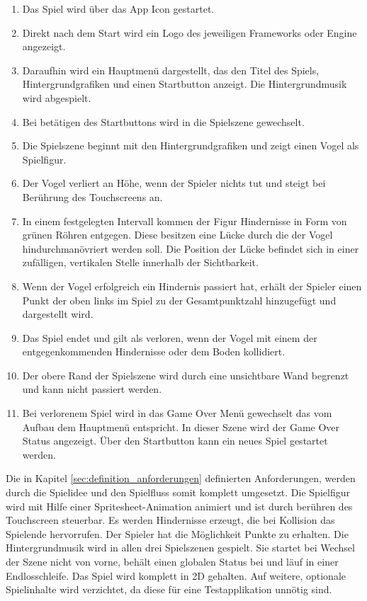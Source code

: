 \begin{enumerate}
	\item Das Spiel wird über das App Icon gestartet.
	\item Direkt nach dem Start wird ein Logo des jeweiligen Frameworks oder Engine angezeigt.
	\item Daraufhin wird ein Hauptmenü dargestellt, das den Titel des Spiels, Hintergrundgrafiken und einen Startbutton anzeigt. Die Hintergrundmusik wird abgespielt.
	\item Bei betätigen des Startbuttons wird in die Spielszene gewechselt.
	\item Die Spielszene beginnt mit den Hintergrundgrafiken und zeigt einen Vogel als Spielfigur.
	\item Der Vogel verliert an Höhe, wenn der Spieler nichts tut und steigt bei Berührung des Touchscreens an.
	\item In einem festgelegten Intervall kommen der Figur Hindernisse in Form von grünen Röhren entgegen. Diese besitzen eine Lücke durch die der Vogel hindurchmanövriert werden soll. Die Position der Lücke befindet sich in einer zufälligen, vertikalen Stelle innerhalb der Sichtbarkeit.
	\item Wenn der Vogel erfolgreich ein Hindernis passiert hat, erhält der Spieler einen Punkt der oben links im Spiel zu der Gesamtpunktzahl hinzugefügt und dargestellt wird.
	\item Das Spiel endet und gilt als verloren, wenn der Vogel mit einem der entgegenkommenden Hindernisse oder dem Boden kollidiert.
	\item Der obere Rand der Spielszene wird durch eine unsichtbare Wand begrenzt und kann nicht passiert werden.
	\item Bei verlorenem Spiel wird in das Game Over Menü gewechselt das vom Aufbau dem Hauptmenü entspricht. In dieser Szene wird der Game Over Status angezeigt. Über den Startbutton kann ein neues Spiel gestartet werden.
\end{enumerate}



Die in Kapitel \ref{sec:definition_anforderungen} definierten Anforderungen, werden durch die Spielidee und den Spielfluss somit komplett umgesetzt. Die Spielfigur wird mit Hilfe einer Spritesheet-Animation animiert und ist durch berühren des Touchscreen steuerbar. Es werden Hindernisse erzeugt, die bei Kollision das Spielende hervorrufen. Der Spieler hat die Möglichkeit Punkte zu erhalten.
Die Hintergrundmusik wird in allen drei Spielszenen gespielt. Sie startet bei Wechsel der Szene nicht von vorne, behält einen globalen Status bei und läuf in einer Endlosschleife. Das Spiel wird komplett in 2D gehalten. Auf weitere, optionale Spielinhalte wird verzichtet, da diese für eine Testapplikation unnötig sind.


